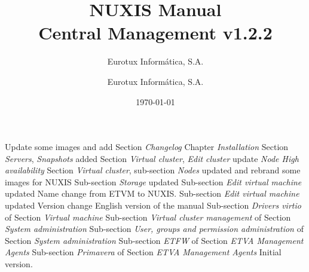 \documentclass[12pt,a4paper,english]{scrreprt}
\author{Eurotux Informática, S.A.}
\title{NUXIS Manual\\Central Management v1.2.2}
\subtitle{Eurotux Informática, S.A.}
\date{\today}
\begin{document}
\maketitle

\begin{Log}
Update some images and add Section \textit{Changelog}
Chapter \textit{Installation}
Section \textit{Servers}, \textit{Snapshots} added
Section \textit{Virtual cluster}, \textit{Edit cluster} update \textit{Node High availability}
Section \textit{Virtual cluster}, sub-section \textit{Nodes} updated and rebrand some images for NUXIS
Sub-section \textit{Storage} updated 
Sub-section \textit{Edit virtual machine} updated 
Name change from ETVM to NUXIS. Sub-section \textit{Edit virtual machine} updated 
Version change
English version of the manual
Sub-section \textit{Drivers virtio} of Section \textit{Virtual machine}
Sub-section \textit{Virtual cluster management} of Section \textit{System administration}
Sub-section \textit{User, groups and permission administration} of Section \textit{System administration}
Sub-section \textit{ETFW} of Section \textit{ETVA Management Agents}
Sub-section \textit{Primavera} of Section \textit{ETVA Management Agents}
Initial version.
\end{Log}

\tableofcontents

\listoffigures


%
%


%


\end{document}
